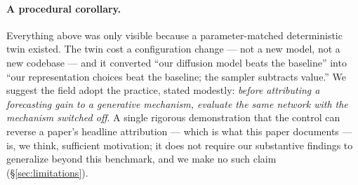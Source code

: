 \documentclass[11pt]{article}
\begin{document}
\paragraph{A procedural corollary.} Everything above was only visible
because a parameter-matched deterministic twin existed. The twin cost a
configuration change --- not a new model, not a new codebase --- and it
converted ``our diffusion model beats the baseline'' into ``our
representation choices beat the baseline; the sampler subtracts value.''
We suggest the field adopt the practice, stated modestly: \emph{before
attributing a forecasting gain to a generative mechanism, evaluate the
same network with the mechanism switched off}. A single rigorous
demonstration that the control can reverse a paper's headline attribution
--- which is what this paper documents --- is, we think, sufficient
motivation; it does not require our substantive findings to generalize
beyond this benchmark, and we make no such claim
(\S\ref{sec:limitations}).
\end{document}
